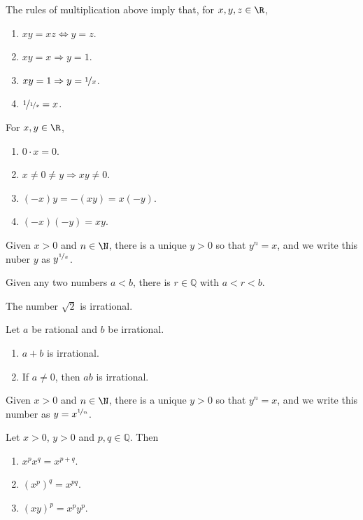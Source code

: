 \documentclass{article}
\begin{document}
\begin{theorem}
	The rules of multiplication above imply that, for $x, y, z \in \R$,
	\begin{enumerate}
		\item $xy=xz\Leftrightarrow y=z$.
		\item $xy=x\Rightarrow y=1$.
		\item $xy=1\Rightarrow y=\nicefrac{1}{x}$.
		\item $\nicefrac{1}{\nicefrac{1}{x}}=x$.
	\end{enumerate}
\end{theorem}
\begin{theorem}
	For $x,y\in\R$,
	\begin{enumerate}
		\item $0\cdot x = 0$.
		\item $x\not=0\not=y\Rightarrow xy\not=0$.
		\item $(-x)y=-(xy)=x(-y)$.
		\item $(-x)(-y)=xy$.
	\end{enumerate}
\end{theorem}
\begin{theorem}
	Given $x>0$ and $n\in\N$, there is a unique $y>0$ so that $y^n=x$, and we write this nuber $y$ as $y^{\nicefrac{1}{x}}$.
\end{theorem}
\begin{theorem}
	Given any two numbers $a<b$, there is $r\in\mathbb{Q}$ with $a<r<b$.
\end{theorem}
\begin{theorem}
	The number $\sqrt{2}$ is irrational.
\end{theorem}
\begin{theorem}
	Let $a$ be rational and $b$ be irrational.
	\begin{enumerate}
		\item $a+b$ is irrational.
		\item If $a\not=0$, then $ab$ is irrational.
	\end{enumerate}
\end{theorem}
\begin{theorem}
	Given $x>0$ and $n\in\N$, there is a unique $y>0$ so that $y^n=x$, and we write this number as $y=x^{\nicefrac{1}{n}}$.
\end{theorem}
\begin{theorem}
	Let $x>0$, $y>0$ and $p,q\in\mathbb{Q}$. Then
	\begin{enumerate}
		\item $x^px^q=x^{p+q}$.
		\item $(x^p)^q=x^{pq}$.
		\item $(xy)^p=x^py^p$.
	\end{enumerate}
\end{theorem}
\end{document}
